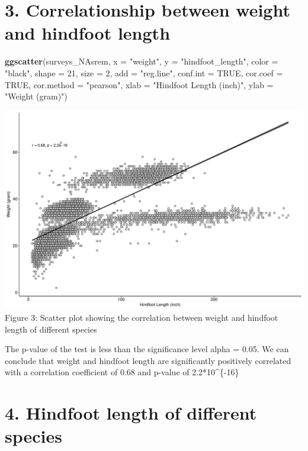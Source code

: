 \documentclass[]{article}
\newenvironment{Shaded}{\begin{snugshade}}{\end{snugshade}}
\newcommand{\KeywordTok}[1]{\textcolor[rgb]{0.13,0.29,0.53}{\textbf{#1}}}
\newcommand{\DataTypeTok}[1]{\textcolor[rgb]{0.13,0.29,0.53}{#1}}
\newcommand{\DecValTok}[1]{\textcolor[rgb]{0.00,0.00,0.81}{#1}}
\newcommand{\StringTok}[1]{\textcolor[rgb]{0.31,0.60,0.02}{#1}}
\newcommand{\OtherTok}[1]{\textcolor[rgb]{0.56,0.35,0.01}{#1}}
\newcommand{\NormalTok}[1]{#1}
\begin{document}
\section{3. Correlationship between weight and hindfoot
length}\label{correlationship-between-weight-and-hindfoot-length}

\begin{Shaded}
\begin{Highlighting}[]
\KeywordTok{ggscatter}\NormalTok{(surveys_NAsrem, }\DataTypeTok{x =} \StringTok{"weight"}\NormalTok{, }\DataTypeTok{y =} \StringTok{"hindfoot_length"}\NormalTok{, }\DataTypeTok{color =} \StringTok{"black"}\NormalTok{, }\DataTypeTok{shape =} \DecValTok{21}\NormalTok{, }\DataTypeTok{size =} \DecValTok{2}\NormalTok{, }\DataTypeTok{add =} \StringTok{"reg.line"}\NormalTok{, }\DataTypeTok{conf.int =} \OtherTok{TRUE}\NormalTok{, }\DataTypeTok{cor.coef =} \OtherTok{TRUE}\NormalTok{, }\DataTypeTok{cor.method =} \StringTok{"pearson"}\NormalTok{,  }\DataTypeTok{xlab =} \StringTok{"Hindfoot Length (inch)"}\NormalTok{, }\DataTypeTok{ylab =} \StringTok{"Weight (gram)"}\NormalTok{)}
\end{Highlighting}
\end{Shaded}

\includegraphics{figs/weight_and_hindfoot_length-1.pdf} Figure 3:
Scatter plot showing the correlation between weight and hindfoot length
of different species

The p-value of the test is less than the significance level alpha =
0.05. We can conclude that weight and hindfoot length are significantly
positively correlated with a correlation coefficient of 0.68 and p-value
of 2.2*10\^{}\{-16\}

\section{4. Hindfoot length of different
species}\label{hindfoot-length-of-different-species}
\end{document}
